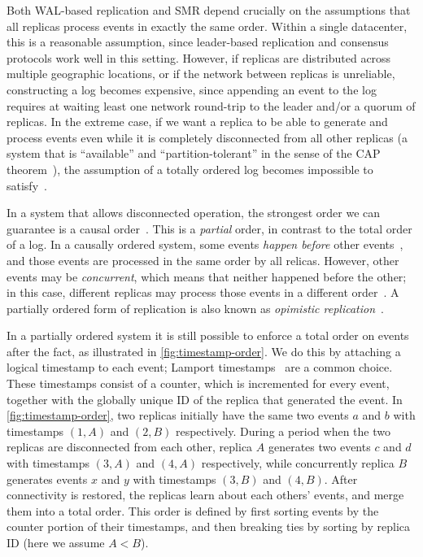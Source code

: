 \documentclass[sigconf]{acmart}
\begin{document}
Both WAL-based replication and SMR depend crucially on the assumptions that all replicas process events in exactly the same order.
Within a single datacenter, this is a reasonable assumption, since leader-based replication and consensus protocols work well in this setting.
However, if replicas are distributed across multiple geographic locations, or if the network between replicas is unreliable, constructing a log becomes expensive, since appending an event to the log requires at waiting least one network round-trip to the leader and/or a quorum of replicas.
In the extreme case, if we want a replica to be able to generate and process events even while it is completely disconnected from all other replicas (a system that is ``available'' and ``partition-tolerant'' in the sense of the CAP theorem~\cite{Gilbert:2002}), the assumption of a totally ordered log becomes impossible to satisfy~\cite{Chandra:1996,Davidson:1985}.

In a system that allows disconnected operation, the strongest order we can guarantee is a causal order~\cite{Attiya:2015}.
This is a \emph{partial} order, in contrast to the total order of a log.
In a causally ordered system, some events \emph{happen before} other events~\cite{Lamport:1978}, and those events are processed in the same order by all relicas.
However, other events may be \emph{concurrent}, which means that neither happened before the other; in this case, different replicas may process those events in a different order~\cite{Birman:1991}.
A partially ordered form of replication is also known as \emph{opimistic replication}~\cite{Saito:2005}.

In a partially ordered system it is still possible to enforce a total order on events after the fact, as illustrated in \autoref{fig:timestamp-order}.
We do this by attaching a logical timestamp to each event; Lamport timestamps~\cite{Lamport:1978} are a common choice.
These timestamps consist of a counter, which is incremented for every event, together with the globally unique ID of the replica that generated the event.
In \autoref{fig:timestamp-order}, two replicas initially have the same two events $a$ and $b$ with timestamps $(1,A)$ and $(2,B)$ respectively.
During a period when the two replicas are disconnected from each other, replica $A$ generates two events $c$ and $d$ with timestamps $(3,A)$ and $(4,A)$ respectively, while concurrently replica $B$ generates events $x$ and $y$ with timestamps $(3,B)$ and $(4,B)$.
After connectivity is restored, the replicas learn about each others' events, and merge them into a total order.
This order is defined by first sorting events by the counter portion of their timestamps, and then breaking ties by sorting by replica ID (here we assume $A<B$).
\end{document}

